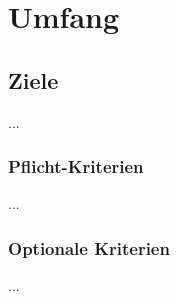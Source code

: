 %
%


\chapter{Umfang}
\label{Umfang}


\section{Ziele}

...
\\


\subsection{Pflicht-Kriterien}

...
\\


\subsection{Optionale Kriterien}

...
\\


